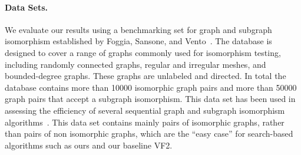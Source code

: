 \paragraph{Data Sets.}
%
We evaluate our results using a benchmarking set for graph and
subgraph isomorphism established by Foggia, Sansone, and
Vento~\cite{argdatabase1}.
%
The database is designed to cover a range of graphs commonly used for
isomorphism testing, including randomly connected graphs, regular and
irregular meshes, and bounded-degree graphs.
%
These graphs are unlabeled and directed.
%
In total the database contains more than 10000 isomorphic graph pairs
and more than 50000 graph pairs that accept a subgraph isomorphism.
%
This data set has been used
in assessing the efficiency of several sequential graph and subgraph
isomorphism algorithms~\cite{argdatabase2,comparisonfive}.
%
This data set contains mainly pairs of isomorphic graphs, rather than
pairs of non isomorphic graphs, which are the ``easy case'' for
search-based algorithms such as ours and our baseline VF2.


